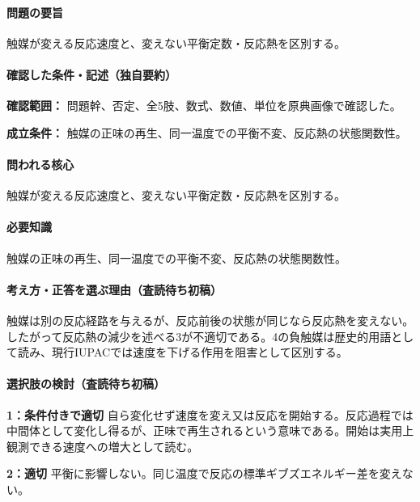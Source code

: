 \paragraph{問題の要旨} 触媒が変える反応速度と、変えない平衡定数・反応熱を区別する。

\paragraph{確認した条件・記述（独自要約）}\mbox{}\par

\noindent\textbf{確認範囲：} 問題幹、否定、全5肢、数式、数値、単位を原典画像で確認した。\par

\noindent\textbf{成立条件：} 触媒の正味の再生、同一温度での平衡不変、反応熱の状態関数性。\par

\paragraph{問われる核心} 触媒が変える反応速度と、変えない平衡定数・反応熱を区別する。

\paragraph{必要知識} 触媒の正味の再生、同一温度での平衡不変、反応熱の状態関数性。

\paragraph{考え方・正答を選ぶ理由（査読待ち初稿）} 触媒は別の反応経路を与えるが、反応前後の状態が同じなら反応熱を変えない。したがって反応熱の減少を述べる3が不適切である。4の負触媒は歴史的用語として読み、現行IUPACでは速度を下げる作用を阻害として区別する。

\paragraph{選択肢の検討（査読待ち初稿）}\mbox{}\par

\noindent\textbf{1：条件付きで適切} 自ら変化せず速度を変え又は反応を開始する。反応過程では中間体として変化し得るが、正味で再生されるという意味である。開始は実用上観測できる速度への増大として読む。\par

\noindent\textbf{2：適切} 平衡に影響しない。同じ温度で反応の標準ギブズエネルギー差を変えない。\par

